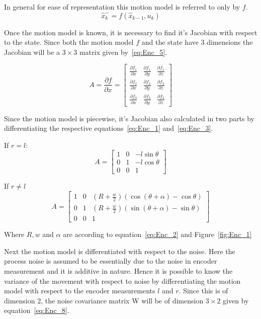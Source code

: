 In general for ease of representation this motion model is referred to only by $ f $. 
\begin{equation}[h!]
\label{eq:Enc_4}
\hat{x}^-_k = f(\hat{x}_{k-1},u_k)
\end{equation}

Once the motion model is known, it is necessary to find it's Jacobian with respect to the state. Since both the motion model $ f $ and the state have 3 dimensions the Jacobian will be a $ 3\times 3 $ matrix given by~\ref{eq:Enc_5}. 

\begin{equation}
\label{eq:Enc_5}
A = \frac{\partial f}{\partial x} = 
\begin{bmatrix}
\frac{\partial f_1}{\partial x} & \frac{\partial f_1}{\partial y} & \frac{\partial f_1}{\partial z} \\
\frac{\partial f_2}{\partial x} & \frac{\partial f_2}{\partial y} & \frac{\partial f_2}{\partial z} \\
\frac{\partial f_3}{\partial x} & \frac{\partial f_3}{\partial y} & \frac{\partial f_3}{\partial z}
\end{bmatrix}
\end{equation}

Since the motion model is piecewise, it's Jacobian also calculated in two parts by differentiating the respective equations~\ref{eq:Enc_1} and~\ref{eq:Enc_3}.

If $ r = l $:
\begin{equation}
\label{eq:Enc_6}
A = 
\begin{bmatrix}
1 & 0 & -l\sin\theta\\
0 & 1 & -l\cos\theta\\
0 & 0 & 1
\end{bmatrix}
\end{equation}

If $ r \neq l $
\begin{equation}
\label{eq:Enc_7}
A = 
\begin{bmatrix}
1 & 0 & (R+\frac{w}{2})(\cos(\theta+\alpha)-\cos\theta)\\
0 & 1 & (R+\frac{w}{2})(\sin(\theta+\alpha)-\sin\theta)\\
0 & 0 & 1
\end{bmatrix}
\end{equation}

Where $ R,w $ and $ \alpha $ are according to equation~\ref{eq:Enc_2} and Figure~\ref{fig:Enc_1}

Next the motion model is differentiated with respect to the noise. Here the process noise is assumed to be essentially due to the noise in encoder measurement and it is additive in nature. Hence it is possible to know the variance of the movement with respect to noise by differentiating the motion model with respect to the encoder measurements $ l $ and $ r $. Since this is of dimension 2, the noise covariance matrix W will be of dimension $ 3\times 2 $ given by equation~\ref{eq:Enc_8}.

